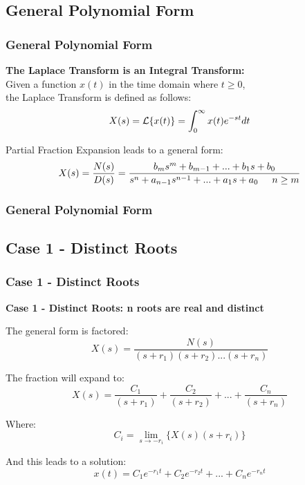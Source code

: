 \documentclass[fleqn]{beamer} %
\newcommand{\sectionIIIsubsectionItitle}{General Polynomial Form}
\newcommand{\sectionIIIsubsectionIItitle}{Case 1 - Distinct Roots}
\begin{document}
		\subsection{\sectionIIIsubsectionItitle}\label{sectionIIIsubsectionI}

			\begin{frame}
				\frametitle{\sectionIIIsubsectionItitle}
				\bigskip

				\textbf{The Laplace Transform is an Integral Transform: } \\

				Given a function $x(t)$ in the time domain where $t\geq0$, \\ the Laplace Transform is defined as follows: \\

				\[ X(s)=\Lagr{\{x(t)\}}=\displaystyle\int_0^{\infty} x(t)e^{-st}dt \]

				Partial Fraction Expansion leads to a general form:  \\

				\[ X(s)=\frac{N(s)}{D(s)}=\frac{b_ms^m+b_{m-1}+...+b_1s+b_0}{s^n+a_{n-1}s^{n-1}+...+a_1s+a_0 \hspace{5mm} n\geq m}\] 

				\btVFill
			\end{frame}

			\begin{frame}
				\frametitle{\sectionIIIsubsectionItitle}
				\bigskip
				

				\btVFill
			\end{frame}

		\subsection{\sectionIIIsubsectionIItitle}\label{sectionIIIsubsectionII}	

			\begin{frame}
				\frametitle{\sectionIIIsubsectionIItitle}
				\bigskip

				\textbf{Case 1 - Distinct Roots: n roots are real and distinct} 

				The general form is factored:
				\[ X(s)=\frac{N(s)}{(s+r_1)(s+r_2)...(s+r_n)} \]

				The fraction will expand to: 
				\[ X(s)=\frac{C_1}{(s+r_1)}+\frac{C_2}{(s+r_2)}+...+\frac{C_n}{(s+r_n)} \]  
				
				Where:
				\[ \displaystyle C_i=\lim_{s\rightarrow-r_i}\{ X(s)(s+r_i) \} \]

				And this leads to a solution: 
				\[x(t)=C_1e^{-r_1t}+C_2e^{-r_2t}+...+C_ne^{-r_nt} \]
	
				\btVFill
			\end{frame}
\end{document}
